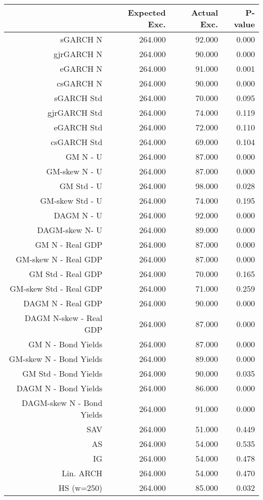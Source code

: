 \documentclass{article}
\begin{document}


\begin{table}[ht]
\centering
\begin{tabular}{rrrr}
  \hline
 & Expected Exc. & Actual Exc. & P-value \\ 
  \hline
sGARCH N & 264.000 & 92.000 & 0.000 \\ 
  gjrGARCH N & 264.000 & 90.000 & 0.000 \\ 
  eGARCH N & 264.000 & 91.000 & 0.001 \\ 
  csGARCH N & 264.000 & 90.000 & 0.000 \\ 
  sGARCH Std & 264.000 & 70.000 & 0.095 \\ 
  gjrGARCH Std & 264.000 & 74.000 & 0.119 \\ 
  eGARCH Std & 264.000 & 72.000 & 0.110 \\ 
  csGARCH Std & 264.000 & 69.000 & 0.104 \\ 
  GM N - U & 264.000 & 87.000 & 0.000 \\ 
  GM-skew N - U & 264.000 & 87.000 & 0.000 \\ 
  GM Std - U & 264.000 & 98.000 & 0.028 \\ 
  GM-skew Std - U & 264.000 & 74.000 & 0.195 \\ 
  DAGM N - U & 264.000 & 92.000 & 0.000 \\ 
  DAGM-skew  N- U & 264.000 & 89.000 & 0.000 \\ 
  GM N - Real GDP & 264.000 & 87.000 & 0.000 \\ 
  GM-skew N - Real GDP & 264.000 & 87.000 & 0.000 \\ 
  GM Std - Real GDP & 264.000 & 70.000 & 0.165 \\ 
  GM-skew Std - Real GDP & 264.000 & 71.000 & 0.259 \\ 
  DAGM N - Real GDP & 264.000 & 90.000 & 0.000 \\ 
  DAGM N-skew - Real GDP & 264.000 & 87.000 & 0.000 \\ 
  GM N - Bond Yields & 264.000 & 87.000 & 0.000 \\ 
  GM-skew N - Bond Yields & 264.000 & 89.000 & 0.000 \\ 
  GM Std - Bond Yields & 264.000 & 90.000 & 0.035 \\ 
  DAGM N - Bond Yields & 264.000 & 86.000 & 0.000 \\ 
  DAGM-skew N - Bond Yields & 264.000 & 91.000 & 0.000 \\ 
  SAV & 264.000 & 51.000 & 0.449 \\ 
  AS & 264.000 & 54.000 & 0.535 \\ 
  IG & 264.000 & 54.000 & 0.478 \\ 
  Lin. ARCH & 264.000 & 54.000 & 0.470 \\ 
  HS (w=250) & 264.000 & 85.000 & 0.032 \\ 
   \hline
\end{tabular}
\end{table}
\end{document}
